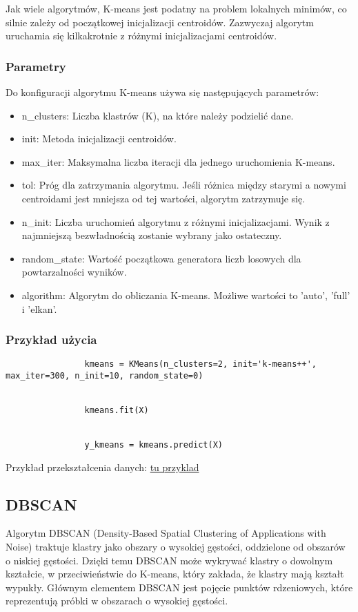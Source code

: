 			Jak wiele algorytmów, K-means jest podatny na problem lokalnych minimów, co silnie zależy od początkowej inicjalizacji centroidów. Zazwyczaj algorytm uruchamia się kilkakrotnie z różnymi inicjalizacjami centroidów.


			
		\subsubsection{Parametry}
			Do konfiguracji algorytmu K-means używa się następujących parametrów:
			\begin{itemize}
				\item n\_clusters: Liczba klastrów (K), na które należy podzielić dane.
				\item init: Metoda inicjalizacji centroidów.
				\item max\_iter: Maksymalna liczba iteracji dla jednego uruchomienia K-means.
				\item tol: Próg dla zatrzymania algorytmu. Jeśli różnica między starymi a nowymi centroidami jest mniejsza od tej wartości, algorytm zatrzymuje się.
				\item n\_init: Liczba uruchomień algorytmu z różnymi inicjalizacjami. Wynik z najmniejszą bezwładnością zostanie wybrany jako ostateczny.
				\item random\_state: Wartość początkowa generatora liczb losowych dla powtarzalności wyników.
				\item algorithm: Algorytm do obliczania K-means. Możliwe wartości to 'auto', 'full' i 'elkan'.
			\end{itemize}
			
		\subsubsection{Przykład użycia}
			\begin{verbatim}
				kmeans = KMeans(n_clusters=2, init='k-means++', max_iter=300, n_init=10, random_state=0)


				kmeans.fit(X)


				y_kmeans = kmeans.predict(X)
			\end{verbatim}
			
			
			Przykład przekształcenia danych:
			\underline{tu przyklad}

	  
	\subsection{DBSCAN}
		Algorytm DBSCAN (Density-Based Spatial Clustering of Applications with Noise) traktuje klastry jako obszary o wysokiej gęstości, oddzielone od obszarów o niskiej gęstości. Dzięki temu DBSCAN może wykrywać klastry o dowolnym kształcie, w przeciwieństwie do K-means, który zakłada, że klastry mają kształt wypukły. Głównym elementem DBSCAN jest pojęcie punktów rdzeniowych, które reprezentują próbki w obszarach o wysokiej gęstości. \cite{dbscan}


